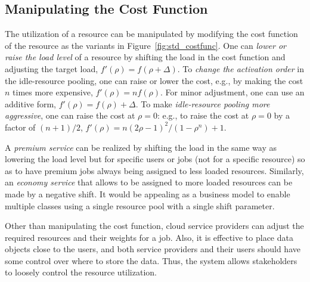 
\subsection{Manipulating the Cost Function}
\label{sec:variation}

The utilization of a resource can be manipulated by modifying the cost
function of the resource as the variants in Figure~\ref{fig:std_costfunc}.
One can {\em lower or raise the load level} of a resource by shifting
the load in the cost function and adjusting the target load,
$f'(\rho) = f(\rho + \Delta)$.
To {\em change the activation order} in the idle-resource pooling,
one can raise or lower the cost,
e.g., by making the cost  $n$ times more expensive, $f'(\rho) = n f(\rho)$.
For minor adjustment, one can use an additive form,
$f'(\rho) = f(\rho) + \Delta$.
To make {\em idle-resource pooling more aggressive},
one can raise the cost at $\rho = 0$:
e.g., to raise the cost at $\rho = 0$ by a factor of $(n+1)/2$,
$f'(\rho) = n (2\rho - 1)^{2}/(1 - \rho^{n}) + 1$.

A {\em premium service} can be realized by shifting the load
in the same way as lowering the load level
but for specific users or jobs (not for a specific resource) so as to
have premium jobs always being assigned to less loaded resources.
Similarly, an {\em economy service} that allows to be assigned to more
loaded resources can be made by a negative shift.
It would be appealing as a business model to enable multiple classes using a single
resource pool with a single shift parameter.


Other than manipulating the cost function,
cloud service providers can adjust the required resources and their
weights for a job.  Also, it is effective to place data objects close to the
users, and both service providers and their users should have some
control over where to store the data.
Thus, the system allows stakeholders to loosely control the
resource utilization.
